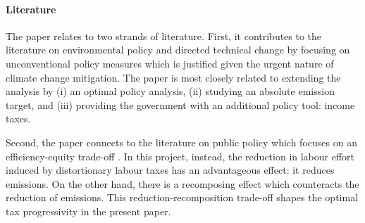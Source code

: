 \paragraph{Literature}
The paper relates to two strands of literature. First, it contributes to the literature on environmental policy and directed technical change \citep[e.g.]{Acemoglu2012TheChange, Acemoglu2016TransitionTechnology} by focusing on unconventional policy measures which is justified given the urgent nature of climate change mitigation.  The paper is most closely related to \cite{Fried2018ClimateAnalysis} extending the analysis by (i) an optimal policy analysis, (ii) studying an absolute emission target, and (iii) providing the government with an additional policy tool: income taxes.

Second, the paper connects to the literature on public policy which focuses on an efficiency-equity trade-off \citep{Heathcote2017OptimalFramework, Loebbing2019NationalChange}. In this project, instead, the reduction in labour effort induced by distortionary labour taxes has an advantageous effect: it reduces emissions. On the other hand, there is a recomposing effect which counteracts the reduction of emissions. This reduction-recomposition trade-off shapes the optimal tax progressivity in the present paper. 